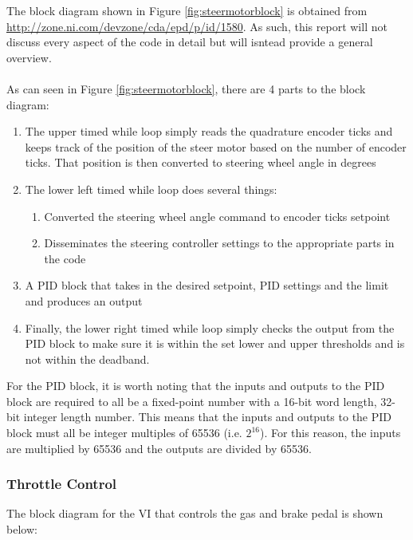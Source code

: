 \noindent The block diagram shown in Figure \ref{fig:steermotorblock} is obtained from \url{http://zone.ni.com/devzone/cda/epd/p/id/1580}. As such, this report will not discuss every aspect of the code in detail but will isntead provide a general overview. \\ \\
%
As can seen in Figure \ref{fig:steermotorblock}, there are 4 parts to the block diagram:

\begin{enumerate}
\item The upper timed while loop simply reads the quadrature encoder ticks and keeps track of the position of the steer motor based on the number of encoder ticks. That position is then converted to steering wheel angle in degrees
\item The lower left timed while loop does several things:
\begin{enumerate}
\item Converted the steering wheel angle command to encoder ticks setpoint
\item Disseminates the steering controller settings to the appropriate parts in the code
\end{enumerate}
\item A PID block that takes in the desired setpoint, PID settings and the limit and produces an output
\item Finally, the lower right timed while loop simply checks the output from the PID block to make sure it is within the set lower and upper thresholds and is not within the deadband. 
\end{enumerate}

\noindent For the PID block, it is worth noting that the inputs and outputs to the PID block are required to all be a fixed-point number with a 16-bit word length, 32-bit integer length number. This means that the inputs and outputs to the PID block must all be integer multiples of 65536 (i.e. $2^{16}$). For this reason, the inputs are multiplied by 65536 and the outputs are divided by 65536.

\subsubsection{Throttle Control}

The block diagram for the VI that controls the gas and brake pedal is shown below:

